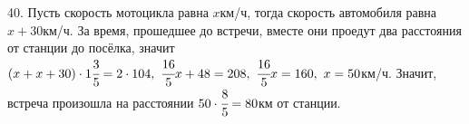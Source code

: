 40. Пусть скорость мотоцикла равна $x$км/ч, тогда скорость автомобиля равна $x+30$км/ч. За время, прошедшее до встречи, вместе они проедут два расстояния от станции до посёлка, значит $(x+x+30)\cdot1\cfrac{3}{5}=2\cdot104,\ \cfrac{16}{5}x+48=208,\ \cfrac{16}{5}x=160,\ x=50$км/ч. Значит, встреча произошла на расстоянии $50\cdot\cfrac{8}{5}=80$км от станции. \\
